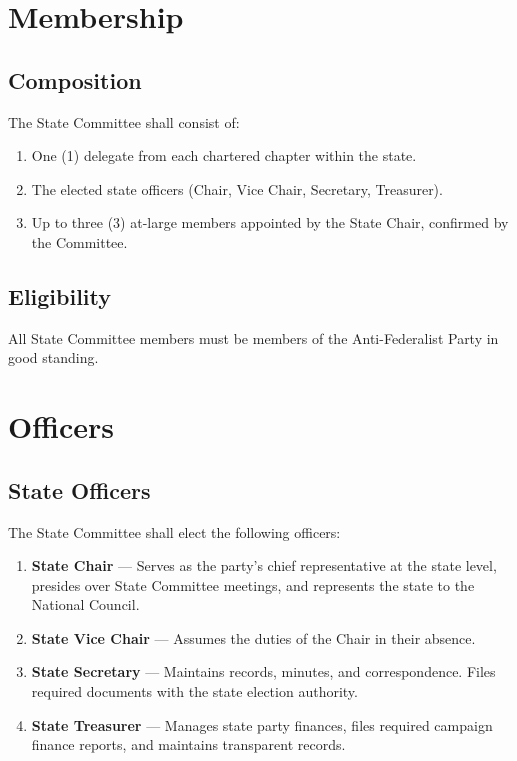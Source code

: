 \documentclass[11pt, letterpaper]{article}
\begin{document}
\section{Membership}

\subsection{Composition}
The State Committee shall consist of:
\begin{enumerate}
  \item One (1) delegate from each chartered chapter within the state.
  \item The elected state officers (Chair, Vice Chair, Secretary, Treasurer).
  \item Up to three (3) at-large members appointed by the State Chair, confirmed by the Committee.
\end{enumerate}

\subsection{Eligibility}
All State Committee members must be members of the Anti-Federalist Party in good standing.

\section{Officers}

\subsection{State Officers}
The State Committee shall elect the following officers:
\begin{enumerate}
  \item \textbf{State Chair} --- Serves as the party's chief representative at the state level, presides over State Committee meetings, and represents the state to the National Council.
  \item \textbf{State Vice Chair} --- Assumes the duties of the Chair in their absence.
  \item \textbf{State Secretary} --- Maintains records, minutes, and correspondence. Files required documents with the state election authority.
  \item \textbf{State Treasurer} --- Manages state party finances, files required campaign finance reports, and maintains transparent records.
\end{enumerate}
\end{document}
